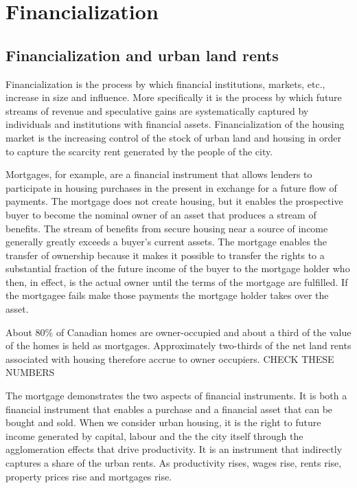 \chapter{Financialization}


\section{Financialization and urban land rents}

Financialization is the process by which financial institutions, markets, etc., increase in size and influence. More specifically it is the process by which future streams of revenue and speculative gains are systematically captured by individuals and institutions with financial assets. Financialization of the housing market is the increasing control of the stock of urban land and housing in order to capture the scarcity rent generated by the people of the city.  

Mortgages, for example, are a financial instrument that allows lenders to  participate in housing purchases in the present in exchange for a future flow of payments.  The mortgage does not create housing, but it enables the prospective buyer to become the nominal owner of an asset that produces a stream of benefits. The stream of benefits from secure housing near a source of income generally greatly exceeds a buyer's current assets. The mortgage enables the  transfer of ownership because it makes it possible to transfer the rights to a substantial fraction of the future income of the buyer to the mortgage holder who then, in effect, is the actual owner until the terms of the mortgage are fulfilled.  If the mortgagee fails make those payments the mortgage holder  takes over the asset. 

About 80\% of Canadian homes are owner-occupied and about a third of the  value of the homes is held as mortgages. Approximately two-thirds of the net land rents associated with housing therefore accrue to owner occupiers. {\color {red}CHECK THESE NUMBERS } 


The mortgage demonstrates the two aspects of financial instruments. It is both a financial instrument that enables a purchase and a financial asset that can be bought and sold. When we consider urban housing, it is the right to future income generated by capital, labour and the the city itself through the agglomeration effects that drive productivity. It is an instrument that indirectly captures a share of the urban rents. As productivity rises, wages rise, rents rise, property prices rise and mortgages rise. 


